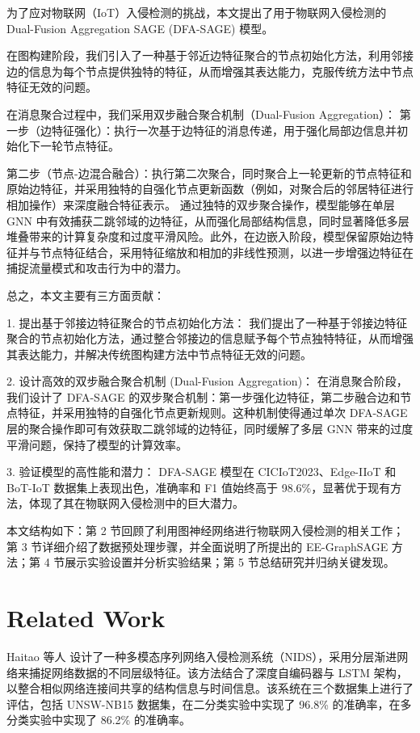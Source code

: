 \documentclass{article}
\begin{document}
为了应对物联网（IoT）入侵检测的挑战，本文提出了用于物联网入侵检测的 Dual-Fusion Aggregation SAGE (DFA-SAGE) 模型。

在图构建阶段，我们引入了一种基于邻近边特征聚合的节点初始化方法，利用邻接边的信息为每个节点提供独特的特征，从而增强其表达能力，克服传统方法中节点特征无效的问题。

在消息聚合过程中，我们采用双步融合聚合机制（Dual-Fusion Aggregation）：
第一步（边特征强化）：执行一次基于边特征的消息传递，用于强化局部边信息并初始化下一轮节点特征。

第二步（节点-边混合融合）：执行第二次聚合，同时聚合上一轮更新的节点特征和原始边特征，并采用独特的自强化节点更新函数（例如，对聚合后的邻居特征进行相加操作）来深度融合特征表示。
通过独特的双步聚合操作，模型能够在单层 GNN 中有效捕获二跳邻域的边特征，从而强化局部结构信息，同时显著降低多层堆叠带来的计算复杂度和过度平滑风险。此外，在边嵌入阶段，模型保留原始边特征并与节点特征结合，采用特征缩放和相加的非线性预测，以进一步增强边特征在捕捉流量模式和攻击行为中的潜力。

总之，本文主要有三方面贡献：

1. 提出基于邻接边特征聚合的节点初始化方法： 我们提出了一种基于邻接边特征聚合的节点初始化方法，通过整合邻接边的信息赋予每个节点独特特征，从而增强其表达能力，并解决传统图构建方法中节点特征无效的问题。

2. 设计高效的双步融合聚合机制 (Dual-Fusion Aggregation)： 在消息聚合阶段，我们设计了 DFA-SAGE 的双步聚合机制：第一步强化边特征，第二步融合边和节点特征，并采用独特的自强化节点更新规则。这种机制使得通过单次 DFA-SAGE 层的聚合操作即可有效获取二跳邻域的边特征，同时缓解了多层 GNN 带来的过度平滑问题，保持了模型的计算效率。

3. 验证模型的高性能和潜力： DFA-SAGE 模型在 CICIoT2023、Edge-IIoT 和 BoT-IoT 数据集上表现出色，准确率和 F1 值始终高于 98.6\%，显著优于现有方法，体现了其在物联网入侵检测中的巨大潜力。

本文结构如下：第 2 节回顾了利用图神经网络进行物联网入侵检测的相关工作；第 3 节详细介绍了数据预处理步骤，并全面说明了所提出的 EE-GraphSAGE 方法；第 4 节展示实验设置并分析实验结果；第 5 节总结研究并归纳关键发现。



\section{Related Work}

Haitao 等人 \cite{He2019} 设计了一种多模态序列网络入侵检测系统（NIDS），采用分层渐进网络来捕捉网络数据的不同层级特征。该方法结合了深度自编码器与 LSTM 架构，以整合相似网络连接间共享的结构信息与时间信息。该系统在三个数据集上进行了评估，包括 UNSW-NB15 数据集，在二分类实验中实现了 96.8\% 的准确率，在多分类实验中实现了 86.2\% 的准确率。
\end{document}
